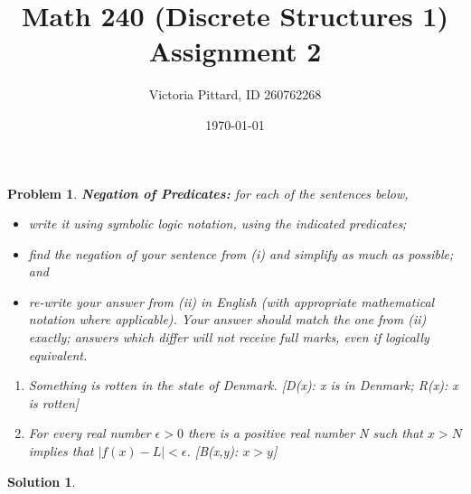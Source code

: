 \documentclass{article}
\newtheorem{problem}{Problem}
\theoremstyle{definition}
\newtheorem*{solution}{Solution}
\begin{document}
\title{Math 240 (Discrete Structures 1) Assignment 2}
\author{Victoria Pittard, ID 260762268}
\date{\today}

\maketitle

\begin{problem}
\textbf{Negation of Predicates:} for each of the sentences below,
\begin{itemize}
    \item write it using symbolic logic notation, using the indicated predicates;
    
    \item find the negation of your sentence from (i) and simplify as much as possible; and
    
    \item re-write your answer from (ii) in English (with appropriate mathematical notation where applicable). Your answer should match the one from (ii) exactly; answers which differ will not receive full marks, even if logically equivalent.
\end{itemize}

\begin{enumerate}[label = \alph*)]
    \item Something is rotten in the state of Denmark. [D(x): x is in Denmark; R(x): x is rotten]
    
    \item For every real number $\epsilon > 0$ there is a positive real number N such that $x>N$ implies that $|f(x)-L|<\epsilon$. [B(x,y): $x>y$]
\end{enumerate}
\end{problem}

\begin{solution}
\end{solution}
\end{document}
